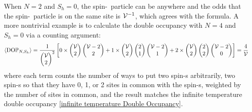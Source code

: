When $N=2$ and $S_h=0$, the spin-\up\ particle can be anywhere and the odds that the spin-\dn\ particle is on the same site is $\mathcal{V}^{-1}$, which agrees with the formula.
A more nontrivial example is to calculate the double occupancy with $N=4$ and $S_h=0$ via a counting argument:
\begin{align}
    \left\langle \textrm{DO} \mathbb{P}_{N,S_h} \right\rangle
    = \frac{1}{\begin{pmatrix} \mathcal{V} \\ 2 \end{pmatrix}^2}\left[
        0 \times \begin{pmatrix} \mathcal{V} \\ 2 \end{pmatrix} \begin{pmatrix} \mathcal{V}-2 \\ 2 \end{pmatrix}
      + 1 \times \begin{pmatrix} \mathcal{V} \\ 2 \end{pmatrix} \begin{pmatrix} 2 \\ 1 \end{pmatrix} \begin{pmatrix} \mathcal{V}-2 \\ 1 \end{pmatrix}
      + 2 \times \begin{pmatrix} \mathcal{V} \\ 2 \end{pmatrix} \begin{pmatrix} 2 \\ 2 \end{pmatrix} \begin{pmatrix} \mathcal{V}-2 \\ 0 \end{pmatrix}
      \right]
    = \frac{4}{\mathcal{V}}
\end{align}
where each term counts the number of ways to put two spin-\up{}s arbitrarily, two spin-\dn{}s so that they have 0, 1, or 2 sites in common with the spin-\up{}s, weighted by the number of sites in common, and the result matches the infinite temperature double occupancy \eqref{infinite temperature Double Occupancy}.
